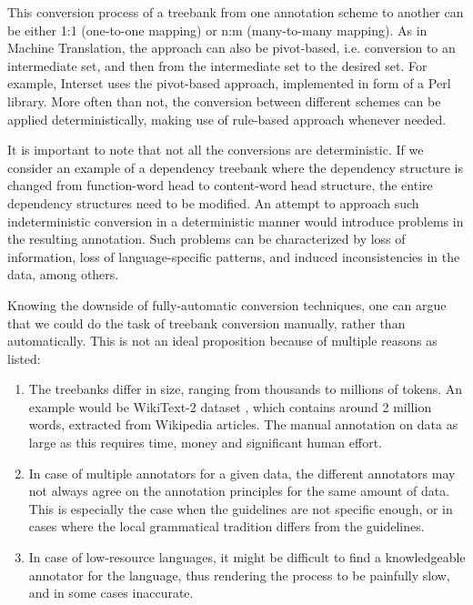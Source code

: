 This conversion process of a treebank from one annotation scheme to another can be either 1:1 (one-to-one mapping) or n:m (many-to-many mapping). As in Machine Translation, the approach can also be pivot-based, i.e. conversion to an intermediate set, and then from the intermediate set to the desired set. For example, Interset \citep{interset}  uses the pivot-based approach, implemented in form of a Perl library. More often than not, the conversion between different schemes can be applied deterministically, making use of rule-based approach whenever needed.

It is important to note that not all the conversions are deterministic. If we consider an example of a dependency treebank where the dependency structure is changed from function-word head to content-word head structure, the entire dependency structures need to be modified. An attempt to approach such indeterministic conversion in a deterministic manner would introduce problems in the resulting annotation. Such problems can be characterized by loss of information, loss of language-specific patterns, and induced inconsistencies in the data, among others.

Knowing the downside of fully-automatic conversion techniques, one can argue that we could do the task of treebank conversion manually, rather than automatically. This is not an ideal proposition because of multiple reasons as listed:
\begin{enumerate}
    \item The treebanks differ in size, ranging from thousands to millions of tokens. An example would be WikiText-2 dataset \citep{Wikitext2}, which contains around 2 million words, extracted from Wikipedia articles. The manual annotation on data as large as this requires time, money and significant human effort.
    \item In case of multiple annotators for a given data, the different annotators may not always agree on the annotation principles for the same amount of data. This is especially the case when the guidelines are not specific enough, or in cases where the local grammatical tradition differs from the guidelines.
    \item In case of low-resource languages, it might be difficult to find a knowledgeable annotator for the language, thus rendering the process to be painfully slow, and in some cases inaccurate.
\end{enumerate}

